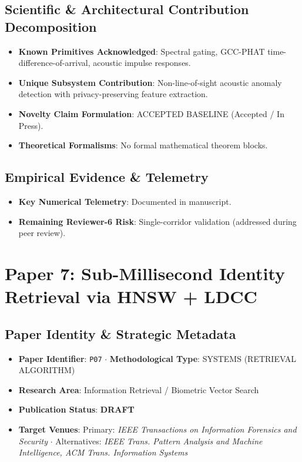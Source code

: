 \documentclass[11pt,a4paper]{article}
\begin{document}
\subsection*{Scientific & Architectural Contribution Decomposition}
\begin{itemize}[leftmargin=1.5em, itemsep=0.2em]
    \item \textbf{Known Primitives Acknowledged}: Spectral gating, GCC-PHAT time-difference-of-arrival, acoustic impulse responses.
    \item \textbf{Unique Subsystem Contribution}: Non-line-of-sight acoustic anomaly detection with privacy-preserving feature extraction.
    \item \textbf{Novelty Claim Formulation}: ACCEPTED BASELINE (Accepted / In Press).
    \item \textbf{Theoretical Formalisms}: No formal mathematical theorem blocks.
\end{itemize}

\subsection*{Empirical Evidence & Telemetry}
\begin{itemize}[leftmargin=1.5em, itemsep=0.2em]
    \item \textbf{Key Numerical Telemetry}: Documented in manuscript.
    \item \textbf{Remaining Reviewer-6 Risk}: Single-corridor validation (addressed during peer review).
\end{itemize}

\section{Paper 7: Sub-Millisecond Identity Retrieval via HNSW + LDCC}

\subsection*{Paper Identity \& Strategic Metadata}
\begin{itemize}[leftmargin=1.5em, itemsep=0.2em]
    \item \textbf{Paper Identifier}: \texttt{P07} $\cdot$ \textbf{Methodological Type}: SYSTEMS (RETRIEVAL ALGORITHM)
    \item \textbf{Research Area}: Information Retrieval / Biometric Vector Search
    \item \textbf{Publication Status}: \textbf{DRAFT}
    \item \textbf{Target Venues}: Primary: \textit{IEEE Transactions on Information Forensics and Security} $\cdot$ Alternatives: \textit{IEEE Trans. Pattern Analysis and Machine Intelligence, ACM Trans. Information Systems}
\end{itemize}
\end{document}
